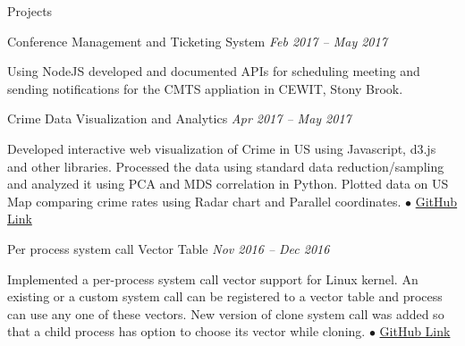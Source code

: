 \documentclass{resume} %
\begin{document}
\begin{rSection}{Projects}


\begin{rSubsection}{Conference Management and Ticketing System} {\emph {Feb 2017 -- May 2017}}{}{}
	\item Using NodeJS developed and documented APIs for scheduling meeting and sending notifications for the CMTS appliation in CEWIT, Stony Brook.
\end{rSubsection}



\begin{rSubsection}{Crime Data Visualization and Analytics} {\emph {Apr 2017 -- May 2017}}{}{}
\item Developed interactive web visualization of Crime in US using Javascript, d3.js and other libraries. Processed the data using standard data reduction/sampling and analyzed it using PCA and MDS correlation in Python. Plotted data on US Map comparing crime rates using Radar chart and Parallel coordinates. 
{\tiny$\bullet$}
\href{https://github.com/t-lohani/Crime-data-visualization-and-analytics}{GitHub Link}
\end{rSubsection}


\begin{rSubsection}{Per process system call Vector Table} {\emph {Nov 2016 -- Dec 2016}}{}{}
\item Implemented a per-process system call vector support for Linux kernel. An existing or a custom system call can be registered to a vector table and process can use any one of these vectors. New version of clone system call was added so that a child process has option to choose its vector while cloning.
{\tiny$\bullet$}
\href{https://github.com/t-lohani/Per-process-system-call}{GitHub Link}
\end{rSubsection}


\end{rSection}
\end{document}

